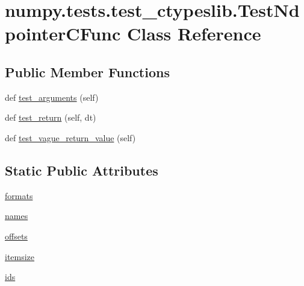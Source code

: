 \hypertarget{classnumpy_1_1tests_1_1test__ctypeslib_1_1TestNdpointerCFunc}{}\section{numpy.\+tests.\+test\+\_\+ctypeslib.\+Test\+Ndpointer\+C\+Func Class Reference}
\label{classnumpy_1_1tests_1_1test__ctypeslib_1_1TestNdpointerCFunc}
\subsection*{Public Member Functions}
\begin{DoxyCompactItemize}
\item 
def \hyperlink{classnumpy_1_1tests_1_1test__ctypeslib_1_1TestNdpointerCFunc_ad805edf0cd0713f421544c598c5111ff}{test\+\_\+arguments} (self)
\item 
def \hyperlink{classnumpy_1_1tests_1_1test__ctypeslib_1_1TestNdpointerCFunc_acf7db5c929633732a1f515e1894ae171}{test\+\_\+return} (self, dt)
\item 
def \hyperlink{classnumpy_1_1tests_1_1test__ctypeslib_1_1TestNdpointerCFunc_a2cdf30ded0928bbac3591f5a6cfabc0e}{test\+\_\+vague\+\_\+return\+\_\+value} (self)
\end{DoxyCompactItemize}
\subsection*{Static Public Attributes}
\begin{DoxyCompactItemize}
\item 
\hyperlink{classnumpy_1_1tests_1_1test__ctypeslib_1_1TestNdpointerCFunc_ab3d1da1ce00edf8516384b4dbc060b02}{formats}
\item 
\hyperlink{classnumpy_1_1tests_1_1test__ctypeslib_1_1TestNdpointerCFunc_a7aba53ecdb35c7e0aa07bbd7e149e42c}{names}
\item 
\hyperlink{classnumpy_1_1tests_1_1test__ctypeslib_1_1TestNdpointerCFunc_af70c61dfaf4d7fc1dfcefb8a1fcc2f3a}{offsets}
\item 
\hyperlink{classnumpy_1_1tests_1_1test__ctypeslib_1_1TestNdpointerCFunc_ac1d8c0564b939701819d9caaa5b8bcd9}{itemsize}
\item 
\hyperlink{classnumpy_1_1tests_1_1test__ctypeslib_1_1TestNdpointerCFunc_a2b2f72af92617be0616f19c81fef64b1}{ids}
\end{DoxyCompactItemize}


